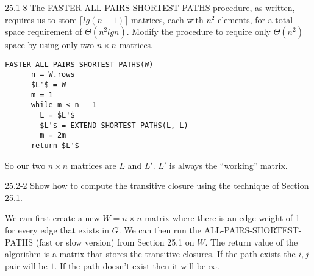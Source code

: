 




\homeworkheader{\classnameandsection}

\begin{problem}{25.1-8}
  The FASTER-ALL-PAIRS-SHORTEST-PATHS procedure, as written, requires us to store $\lceil lg(n-1) \rceil$ matrices,
  each with $n^2$ elements, for a total space requirement of $\Theta(n^2 lg n)$. Modify the procedure to require only
  $\Theta(n^2)$ space by using only two $n \times n$ matrices.
  \begin{solution}
    \begin{lstlisting}[mathescape]
    FASTER-ALL-PAIRS-SHORTEST-PATHS(W)
      n = W.rows
      $L'$ = W
      m = 1
      while m < n - 1
        L = $L'$
        $L'$ = EXTEND-SHORTEST-PATHS(L, L)
        m = 2m
      return $L'$
    \end{lstlisting}
    
    \noindent So our two $n \times n$ matrices are $L$ and $L'$.  $L'$ is always the ``working'' matrix.
  \end{solution}
\end{problem}

\begin{problem}{25.2-2}
  Show how to compute the transitive closure using the technique of Section 25.1.
  \begin{solution}
    We can first create a new $ W = n \times n$ matrix where there is an edge weight of 1 for every edge that exists in
    $G$. We can then run the ALL-PAIRS-SHORTEST-PATHS (fast or slow version) from Section 25.1 on $W$. The return value
    of the algorithm is a matrix that stores the transitive closures.  If the path exists the $i,j$ pair will be $1$.
    If the path doesn't exist then it will be $\infty$.
  \end{solution}
\end{problem}

